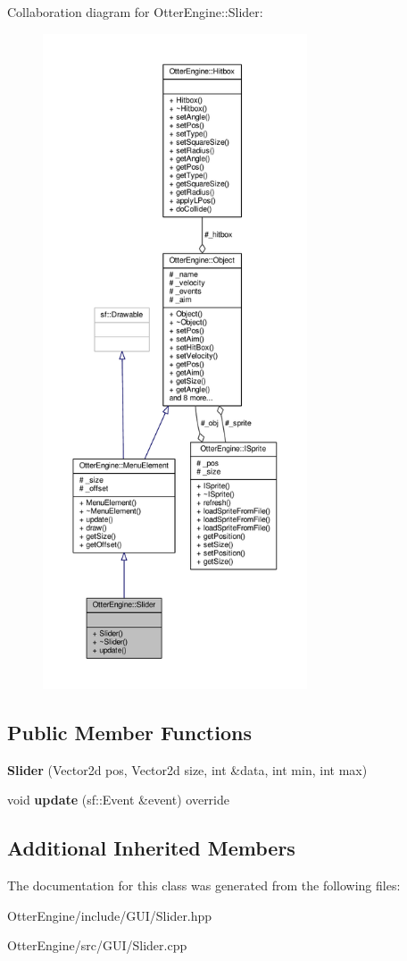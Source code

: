 Collaboration diagram for Otter\+Engine\+:\+:Slider\+:\nopagebreak
\begin{figure}[H]
\begin{center}
\leavevmode
\includegraphics[height=550pt]{d9/de9/class_otter_engine_1_1_slider__coll__graph}
\end{center}
\end{figure}
\subsection*{Public Member Functions}
\begin{DoxyCompactItemize}
\item 
{\bfseries Slider} (Vector2d pos, Vector2d size, int \&data, int min, int max)\hypertarget{class_otter_engine_1_1_slider_aa34cfb69fa1112665be6dab974452dd0}{}\label{class_otter_engine_1_1_slider_aa34cfb69fa1112665be6dab974452dd0}

\item 
void {\bfseries update} (sf\+::\+Event \&event) override\hypertarget{class_otter_engine_1_1_slider_a3bd5d2ca3ffe2dd6ab73e4ef76a44ba0}{}\label{class_otter_engine_1_1_slider_a3bd5d2ca3ffe2dd6ab73e4ef76a44ba0}

\end{DoxyCompactItemize}
\subsection*{Additional Inherited Members}


The documentation for this class was generated from the following files\+:\begin{DoxyCompactItemize}
\item 
Otter\+Engine/include/\+G\+U\+I/Slider.\+hpp\item 
Otter\+Engine/src/\+G\+U\+I/Slider.\+cpp\end{DoxyCompactItemize}

